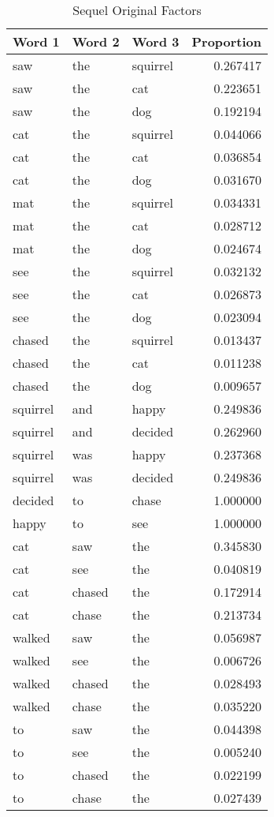 \documentclass[../ut-dissertation.tex]{subfiles}
\begin{document}
\begin{table}[p]
  \centering
  \caption{Sequel Original Factors}\label{tab:sequel_original}
  \begin{tabular}{lll|r}
    \hline
    Word 1 & Word 2 & Word 3 & Proportion \\
    \hline
    saw & the & squirrel & 0.267417\\
    saw & the & cat & 0.223651\\
    saw & the & dog & 0.192194\\
    cat & the & squirrel & 0.044066\\
    cat & the & cat & 0.036854\\
    cat & the & dog & 0.031670\\
    mat & the & squirrel & 0.034331\\
    mat & the & cat & 0.028712\\
    mat & the & dog & 0.024674\\
    see & the & squirrel & 0.032132\\
    see & the & cat & 0.026873\\
    see & the & dog & 0.023094\\
    chased & the & squirrel & 0.013437\\
    chased & the & cat & 0.011238\\
    chased & the & dog & 0.009657\\
    \hline
    squirrel & and & happy & 0.249836\\
    squirrel & and & decided & 0.262960\\
    squirrel & was & happy & 0.237368\\
    squirrel & was & decided & 0.249836\\
    \hline
    decided & to & chase & 1.000000\\
    \hline
    happy & to & see & 1.000000\\
    \hline
    cat & saw & the & 0.345830\\
    cat & see & the & 0.040819\\
    cat & chased & the & 0.172914\\
    cat & chase & the & 0.213734\\
    walked & saw & the & 0.056987\\
    walked & see & the & 0.006726\\
    walked & chased & the & 0.028493\\
    walked & chase & the & 0.035220\\
    to & saw & the & 0.044398\\
    to & see & the & 0.005240\\
    to & chased & the & 0.022199\\
    to & chase & the & 0.027439\\
    \hline
  \end{tabular}
\end{table}
\end{document}
